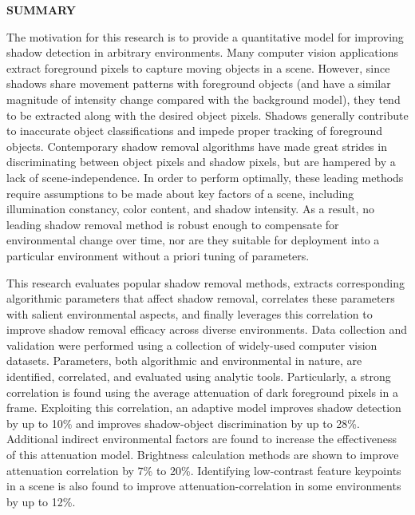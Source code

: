 \clearpage
\begin{centering}
\textbf{SUMMARY}\\
\vspace{\baselineskip}
\end{centering}

The motivation for this research is to provide a quantitative model for improving shadow detection in arbitrary environments. Many computer vision applications extract foreground pixels to capture moving objects in a scene. However, since shadows share movement patterns with foreground objects (and have a similar magnitude of intensity change compared with the background model), they tend to be extracted along with the desired object pixels. Shadows generally contribute to inaccurate object classifications and impede proper tracking of foreground objects. Contemporary shadow removal algorithms have made great strides in discriminating between object pixels and shadow pixels, but are hampered by a lack of scene-independence. In order to perform optimally, these leading methods require assumptions to be made about key factors of a scene, including illumination constancy, color content, and shadow intensity. As a result, no leading shadow removal method is robust enough to compensate for environmental change over time, nor are they suitable for deployment into a particular environment without a priori tuning of parameters.

This research evaluates popular shadow removal methods, extracts corresponding algorithmic parameters that affect shadow removal, correlates these parameters with salient environmental aspects, and finally leverages this correlation to improve shadow removal efficacy across diverse environments. Data collection and validation were performed using a collection of widely-used computer vision datasets. Parameters, both algorithmic and environmental in nature, are identified, correlated, and evaluated using analytic tools. Particularly, a strong correlation is found using the average attenuation of dark foreground pixels in a frame. Exploiting this correlation, an adaptive model improves shadow detection by up to 10\% and improves shadow-object discrimination by up to 28\%. Additional indirect environmental factors are found to increase the effectiveness of this attenuation model. 
Brightness calculation methods are shown to improve attenuation correlation by 7\% to 20\%.
Identifying low-contrast feature keypoints in a scene is also found to improve attenuation-correlation in some environments by up to 12\%.

